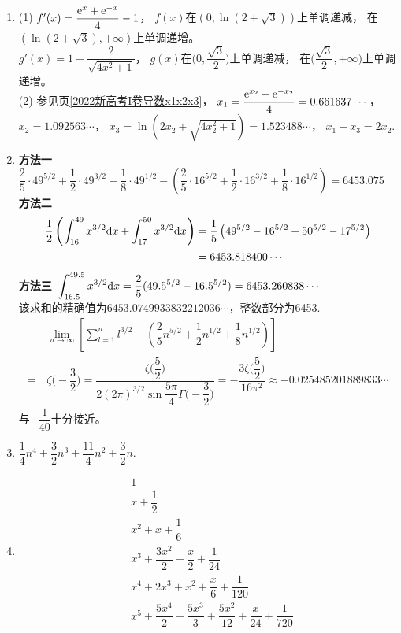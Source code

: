\begin{enumerate}[label={\textbf{\arabic*.}},leftmargin=
    \inteval{\myenumleftmargin}pt]
\item (1) $ f'(x)=\dfrac{\mathrm{e}^x+\mathrm{e}^{-x}}{4}-1 $，
$ f(x) $在$ (0,\ln(2+\sqrt{3})) $上单调递减，
在$ (\ln(2+\sqrt{3}),+\infty) $上单调递增。\\
$ g'(x)=1-\dfrac{2}{\sqrt{4x^2+1}} $，
$ g(x) $在$ \Big(0,\dfrac{\sqrt{3}}{2}\Big) $上单调递减，
在$ \Big(\dfrac{\sqrt{3}}{2},+\infty\Big) $上单调递增。\\
(2) 参见\pageref{2022新高考I卷导数x1x2x3}页\ref{2022新高考I卷导数x1x2x3}，
$ x_1=\dfrac{\mathrm{e}^{x_2}-\mathrm{e}^{-x_2}}{4}=0.661637\cdots $，\\
$ x_2=1.092563\cdots $，
$ x_3=\ln(2x_2+\sqrt{4x_2^2+1})=1.523488\cdots $，
$ x_1+x_3=2x_2 $.

\item 
\textbf{方法一}\ 
$ \dfrac{2}{5}\cdot 49^{5/2}+\dfrac{1}{2}\cdot 49^{3/2}+\dfrac{1}{8}
\cdot 49^{1/2}-\left(
\dfrac{2}{5}\cdot 16^{5/2}+\dfrac{1}{2}\cdot 16^{3/2}+\dfrac{1}{8}\cdot 16^{1/2}\right)=6453.075 $  \\
\textbf{方法二}\ 
\begin{align*}
    \dfrac{1}{2}\left(\int_{16}^{49}x^{3/2}\mathrm{d} x+\int_{17}^{50}x^{3/2}
    \mathrm{d} x \right) &= \dfrac{1}{5}\left( 49^{5/2} -16^{5/2}+50^{5/2}-17^{5/2} 
    \right)\\ &= 6453.818400 \cdots
\end{align*}
\textbf{方法三}\ $ \displaystyle \int_{16.5}^{49.5}x^{3/2}\mathrm{d} x=
\dfrac{2}{5}(49.5^{5/2}-16.5^{5/2})=6453.260838 \cdots $ \\
该求和的精确值为$ 6453.0749933832212036\cdots $，整数部分为6453. \\
\begin{align*}
    &\ \lim\limits_{n\to \infty} \left[ \sum\limits_{l=1}^{n} l^{3/2}-
    \left(\dfrac{2}{5}n^{5/2}+\dfrac{1}{2}n^{1/2}+\dfrac{1}{8}n^{1/2}
    \right)\right]\\ 
    =&\ \zeta\Big(-\dfrac{3}{2}\Big)=\dfrac{\zeta\Big(\dfrac{5}{2}\Big)}
    {2(2\pi)^{3/2}\sin\dfrac{5\pi}{4}\Gamma\Big(-\dfrac{3}{2}\Big)}
    =-\dfrac{3\zeta\Big(\dfrac{5}{2}\Big)}{16\pi^2} \approx -0.025485201889833\cdots
\end{align*}
与$ -\dfrac{1}{40} $十分接近。

\item 
$ \dfrac{1}{4}n^4+\dfrac{3}{2}n^3+\dfrac{11}{4}n^2+\dfrac{3}{2}n $.

\item 
\begin{align*}
    & 1                                             \\
    & x+\dfrac{1}{2}                                \\
    & x^2+x+\dfrac{1}{6}                            \\
    & x^3+\dfrac{3x^2}{2}+\dfrac{x}{2}+\dfrac{1}{24}\\
    & x^4+2x^3+x^2+\dfrac{x}{6}+\dfrac{1}{120}		\\	
    & x^5+\dfrac{5x^4}{2}+\dfrac{5x^3}{3}+\dfrac{5x^2}{12}+
    \dfrac{x}{24}+\dfrac{1}{720}
\end{align*} 


\end{enumerate}
